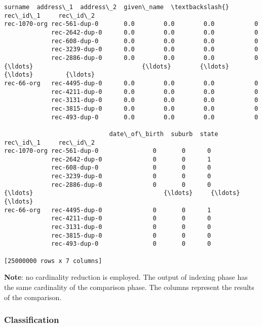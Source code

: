 \documentclass{article}
\begin{document}
    \begin{Verbatim}[commandchars=\\\{\}]

\end{Verbatim}
\begin{Verbatim}[commandchars=\\\{\}]
                             surname  address\_1  address\_2  given\_name  \textbackslash{}
rec\_id\_1     rec\_id\_2                                                    
rec-1070-org rec-561-dup-0       0.0        0.0        0.0           0   
             rec-2642-dup-0      0.0        0.0        0.0           0   
             rec-608-dup-0       0.0        0.0        0.0           0   
             rec-3239-dup-0      0.0        0.0        0.0           0   
             rec-2886-dup-0      0.0        0.0        0.0           0   
{\ldots}                              {\ldots}        {\ldots}        {\ldots}         {\ldots}   
rec-66-org   rec-4495-dup-0      0.0        0.0        0.0           0   
             rec-4211-dup-0      0.0        0.0        0.0           0   
             rec-3131-dup-0      0.0        0.0        0.0           0   
             rec-3815-dup-0      0.0        0.0        0.0           0   
             rec-493-dup-0       0.0        0.0        0.0           0   

                             date\_of\_birth  suburb  state  
rec\_id\_1     rec\_id\_2                                      
rec-1070-org rec-561-dup-0               0       0      0  
             rec-2642-dup-0              0       0      1  
             rec-608-dup-0               0       0      0  
             rec-3239-dup-0              0       0      0  
             rec-2886-dup-0              0       0      0  
{\ldots}                                    {\ldots}     {\ldots}    {\ldots}  
rec-66-org   rec-4495-dup-0              0       0      1  
             rec-4211-dup-0              0       0      0  
             rec-3131-dup-0              0       0      0  
             rec-3815-dup-0              0       0      0  
             rec-493-dup-0               0       0      0  

[25000000 rows x 7 columns]
\end{Verbatim}
    \textbf{Note}: no cardinality reduction is employed. The output of
indexing phase has the same cardinality of the comparison phase. The
columns represent the results of the comparison.

    \hypertarget{classification}{%
\subsubsection{Classification}\label{classification}}
\end{document}
